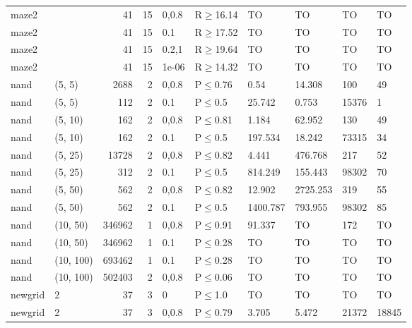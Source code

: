\begin{longtable}{llrrllllll}
 maze2         &           &     	41 &   15 & 0,0.8 & R$\geq$16.14 & TO       & TO       & TO      & TO     \\
 maze2         &           &     	41 &   15 & 0.1   & R$\geq$17.52 & TO       & TO       & TO      & TO     \\
 maze2         &           &     	41 &   15 & 0.2,1 & R$\geq$19.64 & TO       & TO       & TO      & TO     \\
 maze2         &           &     	41 &   15 & 1e-06 & R$\geq$14.32 & TO       & TO       & TO      & TO     \\
 nand          & (5, 5)    &   	2688 &    2 & 0,0.8 & P$\leq$0.76  & 0.54     & 14.308   & 100     & 49     \\
 nand          & (5, 5)    &    	112 &    2 & 0.1   & P$\leq$0.5   & 25.742   & 0.753    & 15376   & 1      \\
 nand          & (5, 10)   &    	162 &    2 & 0,0.8 & P$\leq$0.81  & 1.184    & 62.952   & 130     & 49     \\
 nand          & (5, 10)   &    	162 &    2 & 0.1   & P$\leq$0.5   & 197.534  & 18.242   & 73315   & 34     \\
 nand          & (5, 25)   &  	13728 &    2 & 0,0.8 & P$\leq$0.82  & 4.441    & 476.768  & 217     & 52     \\
 nand          & (5, 25)   &    	312 &    2 & 0.1   & P$\leq$0.5   & 814.249  & 155.443  & 98302   & 70     \\
 nand          & (5, 50)   &    	562 &    2 & 0,0.8 & P$\leq$0.82  & 12.902   & 2725.253 & 319     & 55     \\
 nand          & (5, 50)   &    	562 &    2 & 0.1   & P$\leq$0.5   & 1400.787 & 793.955  & 98302   & 85     \\
 nand          & (10, 50)  & 	346962 &    1 & 0,0.8 & P$\leq$0.91  & 91.337   & TO       & 172     & TO     \\
 nand          & (10, 50)  & 	346962 &    1 & 0.1   & P$\leq$0.28  & TO       & TO       & TO      & TO     \\
 nand          & (10, 100) & 	693462 &    1 & 0.1   & P$\leq$0.28  & TO       & TO       & TO      & TO     \\
 nand          & (10, 100) & 	502403 &    2 & 0,0.8 & P$\leq$0.06  & TO       & TO       & TO      & TO     \\
 newgrid       & 2         &     	37 &    3 & 0     & P$\leq$1.0   & TO       & TO       & TO      & TO     \\
 newgrid       & 2         &     	37 &    3 & 0,0.8 & P$\leq$0.79  & 3.705    & 5.472    & 21372   & 18845  \\

\end{longtable}
